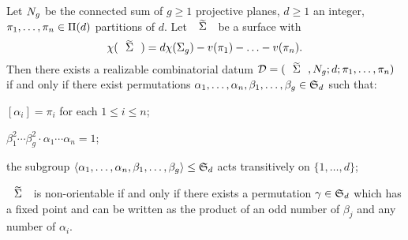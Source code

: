 \begin{corollary}\label{hurwitz:th:monodromy-realizability-non-orientable}
Let $N_{g}$ be the connected sum of $g\ge 1$ projective planes, $d\ge 1$ an integer, $\pi_1,\ldots,\pi_n\in\Pi(d)$ partitions of $d$. Let $\tSigma$ be a surface with
\[
\chi(\tSigma)=d\chi(\surf{g})-v(\pi_1)-\ldots-v(\pi_n).
\]
 Then there exists a realizable combinatorial datum $\DD=\datum{\tSigma,\nosurf{g}}{d}{\pi_1,\ldots,\pi_n}$ if and only if there exist permutations $\alpha_1,\ldots,\alpha_n,\beta_1,\ldots,\beta_g\in\symgroup[d]$ such that:
\begin{enumroman}
\item\label{hurwitz:it:monodomy-realizability-non-orientable-first} $[\alpha_i]=\pi_i$ for each $1\le i\le n$;
\item $\beta_1^2\cdots\beta_g^2\cdot\alpha_1\cdots\alpha_n=1$;
\item\label{hurwitz:it:monodomy-realizability-non-orientable-third} the subgroup $\angled{\alpha_1,\ldots,\alpha_n,\beta_1,\ldots,\beta_g}\subgroup\symgroup[d]$ acts transitively on $\{1,\ldots,d\}$;
\item\label{hurwitz:it:monodomy-realizability-non-orientable-fourth} $\tSigma$ is non-orientable if and only if there exists a permutation $\gamma\in\symgroup[d]$ which has a fixed point and can be written as the product of an odd number of $\beta_j$ and any number of $\alpha_i$.
\end{enumroman}
\end{corollary}
